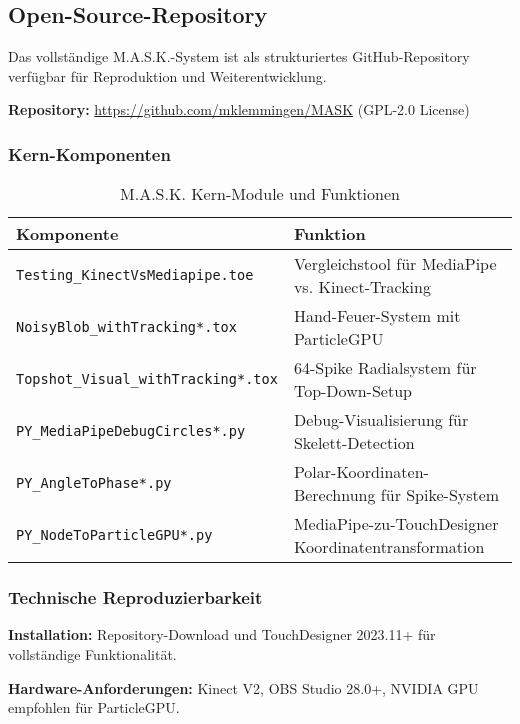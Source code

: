 \subsection{Open-Source-Repository}

Das vollständige M.A.S.K.-System ist als strukturiertes GitHub-Repository verfügbar für Reproduktion und Weiterentwicklung.

\textbf{Repository:} \url{https://github.com/mklemmingen/MASK} (GPL-2.0 License)

\subsubsection{Kern-Komponenten}

\begin{table}[H]
    \centering
    \begin{tabular}{|l|p{8cm}|}
        \hline
        \textbf{Komponente} & \textbf{Funktion} \\ \hline
        \texttt{Testing\_KinectVsMediapipe.toe} & Vergleichstool für MediaPipe vs. Kinect-Tracking \\ \hline
        \texttt{NoisyBlob\_withTracking*.tox} & Hand-Feuer-System mit ParticleGPU \\ \hline
        \texttt{Topshot\_Visual\_withTracking*.tox} & 64-Spike Radialsystem für Top-Down-Setup \\ \hline
        \texttt{PY\_MediaPipeDebugCircles*.py} & Debug-Visualisierung für Skelett-Detection \\ \hline
        \texttt{PY\_AngleToPhase*.py} & Polar-Koordinaten-Berechnung für Spike-System \\ \hline
        \texttt{PY\_NodeToParticleGPU*.py} & MediaPipe-zu-TouchDesigner Koordinatentransformation \\ \hline
    \end{tabular}
    \caption{M.A.S.K. Kern-Module und Funktionen}
    \label{tab:core_modules}
\end{table}

\subsubsection{Technische Reproduzierbarkeit}

\textbf{Installation:} Repository-Download und TouchDesigner 2023.11+ für vollständige Funktionalität.

\textbf{Hardware-Anforderungen:} Kinect V2, OBS Studio 28.0+, NVIDIA GPU empfohlen für ParticleGPU.

